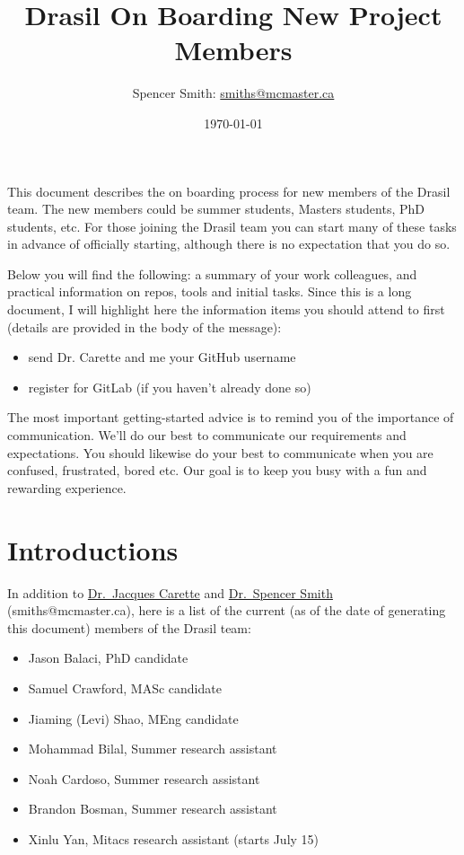 \documentclass[12pt]{article}
\begin{document}
\title{Drasil On Boarding New Project Members}

\author{Spencer Smith: \href{mailto:smiths@mcmaster.ca}{smiths@mcmaster.ca}}
\date{\today}

\maketitle

\tableofcontents

\newpage

This document describes the on boarding process for new members of the Drasil
team.  The new members could be summer students, Masters students, PhD students,
etc. For those joining the Drasil team you can start many of these tasks in advance
of officially starting, although there is no expectation that you do so.

Below you will find the following: a summary of your work colleagues, and
practical information on repos, tools and initial tasks. Since this is a long
document, I will highlight here the information items you should attend to first
(details are provided in the body of the message):

\begin{itemize}
\item send Dr. Carette and me your GitHub username
\item register for GitLab (if you haven't already done so)
\end{itemize}

The most important getting-started advice is to remind you of the importance of
communication.  We'll do our best to communicate our requirements and
expectations.  You should likewise do your best to communicate when you are
confused, frustrated, bored etc.  Our goal is to keep you busy with a fun and
rewarding experience.

\section{Introductions} \label{SecIntroductions}

In addition to \href{https://www.cas.mcmaster.ca/~carette/} {Dr.\ Jacques
Carette} and \href{https://www.cas.mcmaster.ca/~smiths/} {Dr.\ Spencer Smith}
(smiths@mcmaster.ca), here is a list of the current (as of the date of
generating this document) members of the Drasil team:

\begin{itemize}
\item Jason Balaci, PhD candidate
\item Samuel Crawford, MASc candidate
\item Jiaming (Levi) Shao, MEng candidate
\item Mohammad Bilal, Summer research assistant
\item Noah Cardoso, Summer research assistant
\item Brandon Bosman, Summer research assistant
\item Xinlu Yan, Mitacs research assistant (starts July 15)
\end{itemize}
\end{document}
